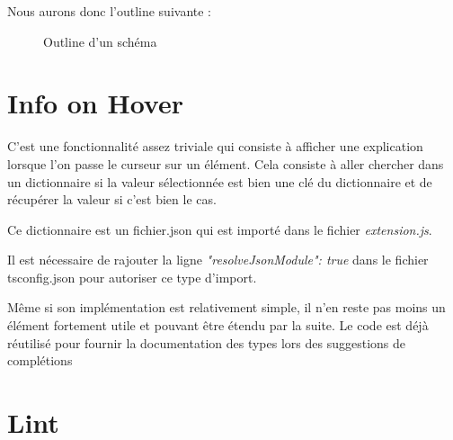 \documentclass[
    iict, %
    il, %
]{heig-tb}
\begin{document}
Nous aurons donc l'outline suivante :

\begin{figure}[!h]
    \begin{center}
    \end{center}
    \caption[Outline d'un schéma]{\label{uon-schema-outline} Outline d'un schéma}
\end{figure}

\section{Info on Hover}

C'est une fonctionnalité assez triviale qui consiste à afficher une explication lorsque l'on passe le curseur sur un élément.
Cela consiste à aller chercher dans un dictionnaire si la valeur sélectionnée est bien une clé du dictionnaire et de récupérer la valeur si c'est bien le cas.

Ce dictionnaire est un fichier.json qui est importé dans le fichier \emph{extension.js}.

Il est nécessaire de rajouter la ligne \emph{"resolveJsonModule": true} dans le fichier tsconfig.json pour autoriser ce type d'import.

Même si son implémentation est relativement simple, il n'en reste pas moins un élément fortement utile et pouvant être étendu par la suite.
Le code est déjà réutilisé pour fournir la documentation des types lors des suggestions de complétions  %

\section{Lint}
\end{document}
